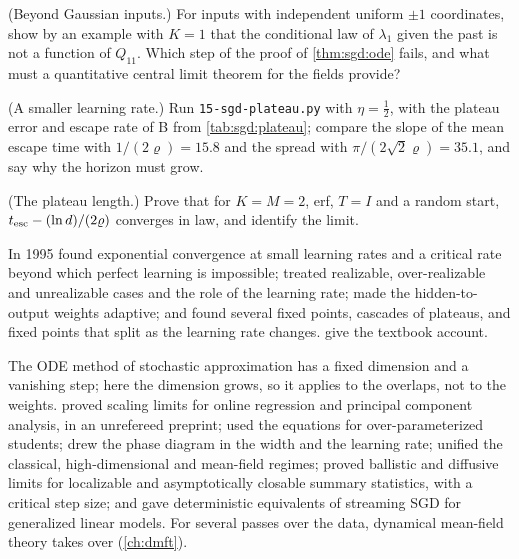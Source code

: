 \begin{refsection}
\begin{exercises}
\item \translate\hard (Beyond Gaussian inputs.) For inputs with independent uniform $\pm1$ coordinates, show by an example with $K=1$ that the conditional law of $\lambda_1$ given the past is not a function of $Q_{11}$. Which step of the proof of \cref{thm:sgd:ode} fails, and what must a quantitative central limit theorem for the fields provide?\label{ex:sgd:rademacher}

\item \measurement (A smaller learning rate.) Run \texttt{15-sgd-plateau.py} with $\eta=\frac12$, with the plateau error and escape rate of B from \cref{tab:sgd:plateau}; compare the slope of the mean escape time with $1/(2\varrho)=15.8$ and the spread with $\pi/(2\sqrt2\varrho)=35.1$, and say why the horizon must grow.\label{ex:sgd:measure}

\item \research (The plateau length.) Prove that for $K=M=2$, erf, $T=I$ and a random start, $t_{\mathrm{esc}}-(\ln d)/(2\varrho)$ converges in law, and identify the limit. \label{ex:sgd:research}
\end{exercises}

\notesandrefs

In 1995 \textcite{BiehlSchwarze1995} found exponential convergence at small learning rates and a critical rate beyond which perfect learning is impossible; \textcite{SaadSolla1995a,SaadSolla1995b} treated realizable, over-realizable and unrealizable cases and the role of the learning rate; \textcite{RieglerBiehl1995} made the hidden-to-output weights adaptive; and \textcite{BiehlRieglerWohler1996} found several fixed points, cascades of plateaus, and fixed points that split as the learning rate changes. \Textcite[Chapters~9 and~13]{EngelVandenBroeck2001} give the textbook account.

The ODE method of stochastic approximation \parencite{Ljung1977} has a fixed dimension and a vanishing step; here the dimension grows, so it applies to the overlaps, not to the weights. \Textcite{WangMattinglyLu2017} proved scaling limits for online regression and principal component analysis, in an unrefereed preprint; \textcite{GoldtEtAl2020a} used the equations for over-parameterized students; \textcite{VeigaEtAl2022} drew the phase diagram in the width and the learning rate; \textcite{ArnaboldiEtAl2023} unified the classical, high-dimensional and mean-field regimes; \textcite[Theorem~2.3]{BenArousGheissariJagannath2024} proved ballistic and diffusive limits for localizable and asymptotically closable summary statistics, with a critical step size; and \textcite{CollinsWoodfinEtAl2024} gave deterministic equivalents of streaming SGD for generalized linear models. For several passes over the data, dynamical mean-field theory takes over (\cref{ch:dmft}).


\end{refsection}
